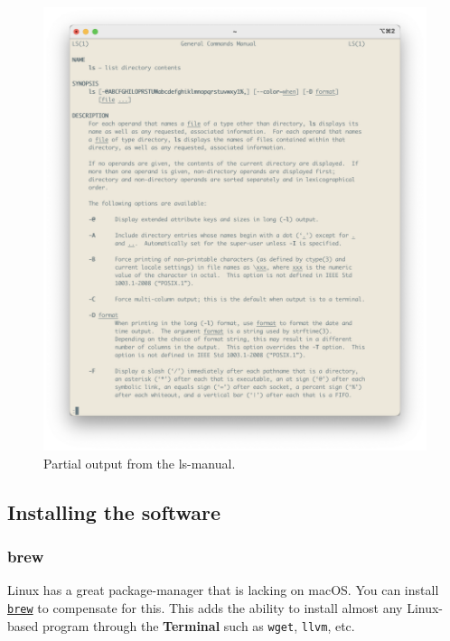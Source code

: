 \documentclass[
]{book}
\newcommand{\passthrough}[1]{#1}
\begin{document}
\begin{figure}[H]

{\centering \includegraphics[width=22.64in]{img/ls_manual} 

}

\caption{Partial output from the ls-manual.}\label{fig:ls-manual}
\end{figure}

\hypertarget{installing-the-software}{%
\subsection{Installing the software}\label{installing-the-software}}

\hypertarget{brew}{%
\subsubsection{brew}\label{brew}}

Linux has a great package-manager that is lacking on macOS. You can install \href{https://brew.sh}{\passthrough{\lstinline!brew!}} to compensate for this. This adds the ability to install almost any Linux-based program through the \textbf{Terminal} such as \passthrough{\lstinline!wget!}, \passthrough{\lstinline!llvm!}, etc.
\end{document}
